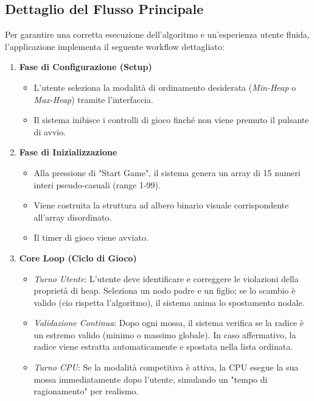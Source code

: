 \documentclass[openany]{theme/uniprthesis}
\begin{document}
\subsection{Dettaglio del Flusso Principale}
Per garantire una corretta esecuzione dell'algoritmo e un'esperienza utente fluida, l'applicazione implementa il seguente workflow dettagliato:

\begin{enumerate}
    \item \textbf{Fase di Configurazione (Setup)}
    \begin{itemize}
        \item L'utente seleziona la modalità di ordinamento desiderata (\textit{Min-Heap} o \textit{Max-Heap}) tramite l'interfaccia.
        \item Il sistema inibisce i controlli di gioco finché non viene premuto il pulsante di avvio.
    \end{itemize}

    \item \textbf{Fase di Inizializzazione}
    \begin{itemize}
        \item Alla pressione di "Start Game", il sistema genera un array di 15 numeri interi pseudo-casuali (range 1-99).
        \item Viene costruita la struttura ad albero binario visuale corrispondente all'array disordinato.
        \item Il timer di gioco viene avviato.
    \end{itemize}

    \item \textbf{Core Loop (Ciclo di Gioco)}
    \begin{itemize}
        \item \textit{Turno Utente}: L'utente deve identificare e correggere le violazioni della proprietà di heap. Seleziona un nodo padre e un figlio; se lo scambio è valido (cio rispetta l'algoritmo), il sistema anima lo spostamento nodale.
        \item \textit{Validazione Continua}: Dopo ogni mossa, il sistema verifica se la radice è un estremo valido (minimo o massimo globale). In caso affermativo, la radice viene estratta automaticamente e spostata nella lista ordinata.
        \item \textit{Turno CPU}: Se la modalità competitiva è attiva, la CPU esegue la sua mossa immediatamente dopo l'utente, simulando un "tempo di ragionamento" per realismo.
    \end{itemize}


\end{enumerate}
\end{document}

